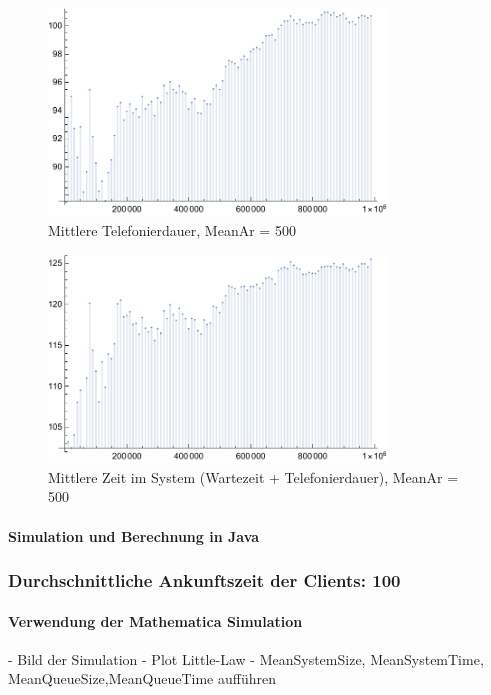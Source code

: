 \begin{figure}[htpb]
	\centering
	\includegraphics[width=0.8\textwidth]{abbildungen/auswertung500/meanCallingTimePlot.pdf}
	\caption{Mittlere Telefonierdauer, MeanAr = 500}
	\label{fig:meanCallingTime500}
\end{figure}

\begin{figure}[htpb]
	\centering
	\includegraphics[width=0.8\textwidth]{abbildungen/auswertung500/meanSystemTimePlot.pdf}
	\caption{Mittlere Zeit im System (Wartezeit + Telefonierdauer), MeanAr = 500}
	\label{fig:meanSystemTime500}
\end{figure}
\paragraph{Simulation und Berechnung in Java}


\subsubsection{Durchschnittliche Ankunftszeit der Clients: 100}
\paragraph{Verwendung der Mathematica Simulation}
- Bild der Simulation 
- Plot Little-Law
- MeanSystemSize, MeanSystemTime, MeanQueueSize,MeanQueueTime aufführen

